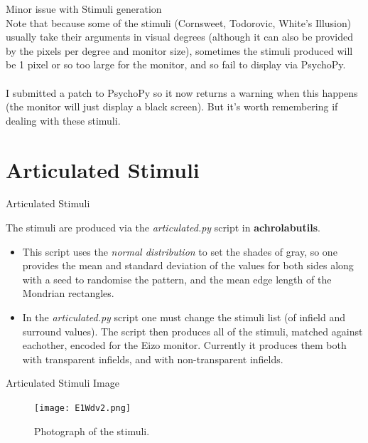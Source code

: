 \documentclass{beamer}
\begin{document}
\begin{frame}[t]{Minor issue with Stimuli generation}
~\\
Note that because some of the stimuli (Cornsweet, Todorovic, White's Illusion) usually take their arguments in \alert{visual degrees} (although it can also be provided by the \alert{pixels per degree} and \alert{monitor size}), sometimes the stimuli produced will be 1 pixel or so too large for the monitor, and so fail to display via PsychoPy.\\
~\\
I submitted a patch to PsychoPy so it now returns a warning when this happens (the monitor will just display a black screen). But it's worth remembering if dealing with these stimuli.
\end{frame}
\section{Articulated Stimuli}


\begin{frame}[t]{Articulated Stimuli}

The stimuli are produced via the {\it articulated.py} script in {\bf achrolabutils}. 

\begin{itemize}
\item This script uses the \emph{normal distribution} to set the shades of gray, so one provides the \alert{mean} and \alert{standard deviation} of the values for both sides along with a \alert{seed} to randomise the pattern, and the \alert{mean edge length of the Mondrian rectangles}.

\item In the {\it articulated.py} script one must change the stimuli list (of infield and surround values). The script then produces all of the stimuli, matched against eachother, encoded for the Eizo monitor. Currently it produces them both with transparent infields, and with non-transparent infields.
\end{itemize}
\end{frame}

\begin{frame}[t]{Articulated Stimuli Image}
\begin{figure}[c]
\texttt{[image: E1Wdv2.png]}
\caption{Photograph of the stimuli.}
\end{figure}
\end{frame}
\end{document}

